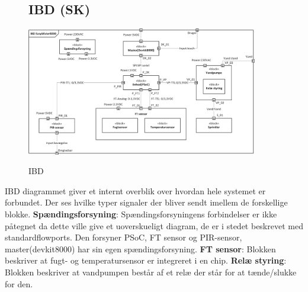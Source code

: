 \begin{figure}[H] \centering
\subsection{IBD (SK)}
{\includegraphics[width=0.9\textwidth]{filer/systemarkitektur/IBD}}
\caption{IBD}
\label{lab:ibd}
\raggedright
\end{figure}
IBD diagrammet giver et internt overblik over hvordan hele systemet er forbundet. Der ses hvilke typer signaler der bliver sendt imellem de forskellige blokke. \newline \newline
\textbf{Spændingsforsyning}: Spændingsforsyningens forbindelser er ikke påtegnet da dette ville give et uoverskueligt diagram, de er i stedet beskrevet med standardflowports. Den forsyner PSoC, FT sensor og PIR-sensor, master(devkit8000) har sin egen spændingsforsyning.  \newline \newline
\textbf{FT sensor}: Blokken beskriver at fugt- og temperatursensor er integreret i en chip. \newline \newline
\textbf{Relæ styring}: Blokken beskriver at vandpumpen består af et relæ der står for at tænde/slukke for den. \newline \newline


